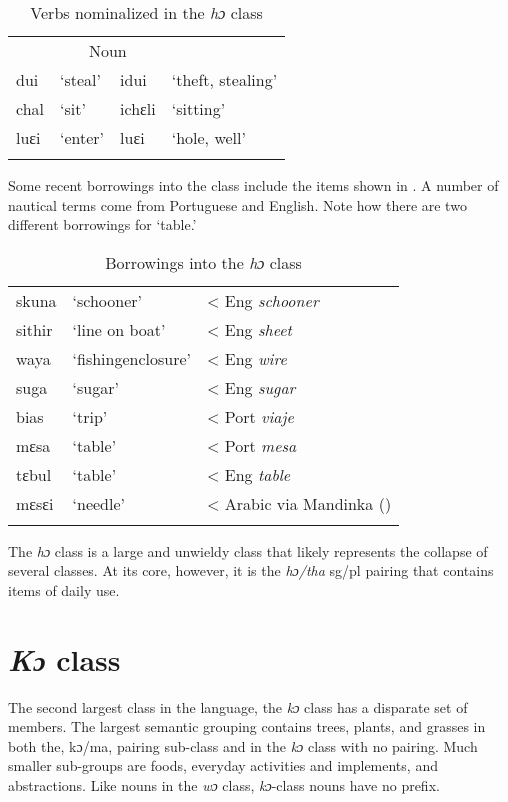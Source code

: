 \begin{table}
\caption{\label{tab:nounclass:39}Verbs nominalized in the \textit{hɔ} class}
\begin{tabular}{llll}
\lsptoprule
\multicolumn{2}{c}{Verb} & \multicolumn{2}{c}{Noun}\\
\cmidrule(lr){1-2}\cmidrule(lr){3-4}
dui & ‘steal' & idui & ‘theft, stealing'\\
 chal & ‘sit' &ichɛli & ‘sitting'\\
luɛi & ‘enter' & luɛi & ‘hole, well' \\
\lspbottomrule
\end{tabular}
\end{table}

Some recent borrowings into the class include the items shown in . A number of nautical terms come from Portuguese and English. Note how there are two different borrowings for ‘table.'

\begin{table}
\caption{\label{tab:nounclass:40}Borrowings into the \textit{hɔ} class}



\begin{tabular}{lll}
\lsptoprule
skuna & ‘schooner' & < Eng \textit{schooner}\\
sithir & ‘line on boat' & < Eng \textit{sheet}\\
waya & ‘fishingenclosure' & < Eng \textit{wire}\\
suga & ‘sugar' & < Eng \textit{sugar}\\
bias & ‘trip' & < Port \textit{viaje}\\
mɛsa & ‘table' & < Port \textit{mesa}\\
tɛbul & ‘table' & < Eng \textit{table}\\
mɛsɛi & ‘needle' & < Arabic via Mandinka (\citealt{Pichl1967})\\
\lspbottomrule
\end{tabular}
\end{table}

The \textit{hɔ} class is a large and unwieldy class that likely represents the collapse of several classes. At its core, however, it is the \textit{hɔ/tha} sg/pl pairing that contains items of daily use.

\section{\textit{Kɔ} class}
\label{sec:5.8}\hypertarget{Toc115517795}{}
The second largest class in the language, the \textit{kɔ} class has a disparate set of members. The largest semantic grouping contains trees, plants, and grasses in both the, kɔ/ma, pairing sub-class and in the \textit{kɔ} class with no pairing. Much smaller sub-groups are foods, everyday activities and implements, and abstractions. Like nouns in the \textit{wɔ} class, \textit{kɔ}{}-class nouns have no prefix.


